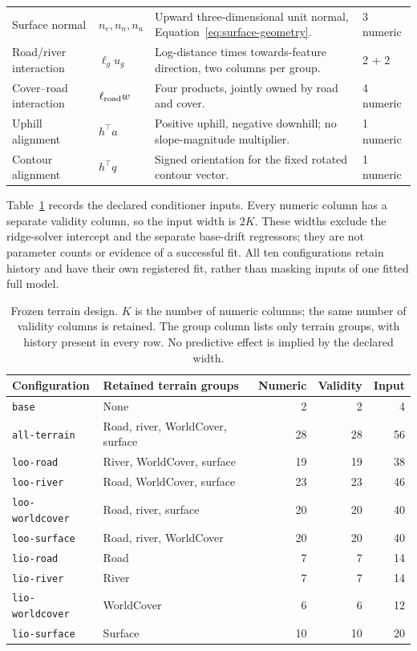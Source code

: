 {\begin{longtable}{p{.16\linewidth}p{.16\linewidth}p{.44\linewidth}p{.12\linewidth}}
Surface normal & \(n_e,n_n,n_u\) & Upward three-dimensional unit normal, Equation~\eqref{eq:surface-geometry}. & 3 numeric\\
Road/river interaction & \(\ell_g u_g\) & Log-distance times towards-feature direction, two columns per group. & 2 + 2\\
Cover--road interaction & \(\ell_{\rm road}w\) & Four products, jointly owned by road and cover. & 4 numeric\\
Uphill alignment & \(h^\top a\) & Positive uphill, negative downhill; no slope-magnitude multiplier. & 1 numeric\\
Contour alignment & \(h^\top q\) & Signed orientation for the fixed rotated contour vector. & 1 numeric\\
\bottomrule
\end{longtable}
}

Table~\ref{tab:terrain-design} records the declared conditioner inputs.
Every numeric column has a separate validity column, so the input width is
\(2K\). These widths exclude the ridge-solver intercept and the separate
base-drift regressors; they are not parameter counts or evidence of a
successful fit. All ten configurations retain history and have their own
registered fit, rather than masking inputs of one fitted full model.

\begin{table}[htbp]
\centering\small
\caption{Frozen terrain design. \(K\) is the number of numeric columns;
the same number of validity columns is retained. The group column lists only
terrain groups, with history present in every row. No predictive effect is
implied by the declared width.}
\label{tab:terrain-design}\hypertarget{tab:terrain-design}{}
\begin{tabular}{p{.24\linewidth}p{.35\linewidth}rrr}
\toprule
Configuration & Retained terrain groups & Numeric & Validity & Input\\
\midrule
\texttt{base} & None & 2 & 2 & 4\\
\texttt{all-terrain} & Road, river, WorldCover, surface & 28 & 28 & 56\\
\texttt{loo-road} & River, WorldCover, surface & 19 & 19 & 38\\
\texttt{loo-river} & Road, WorldCover, surface & 23 & 23 & 46\\
\texttt{loo-worldcover} & Road, river, surface & 20 & 20 & 40\\
\texttt{loo-surface} & Road, river, WorldCover & 20 & 20 & 40\\
\texttt{lio-road} & Road & 7 & 7 & 14\\
\texttt{lio-river} & River & 7 & 7 & 14\\
\texttt{lio-worldcover} & WorldCover & 6 & 6 & 12\\
\texttt{lio-surface} & Surface & 10 & 10 & 20\\
\bottomrule
\end{tabular}
\end{table}

